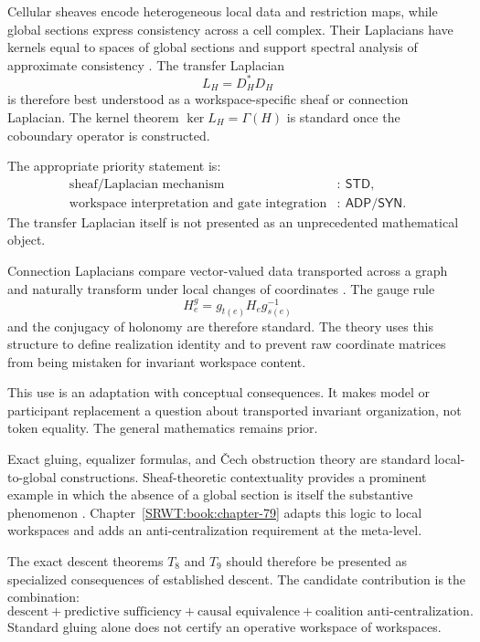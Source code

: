 
Cellular sheaves encode heterogeneous local data and restriction maps, while
global sections express consistency across a cell complex. Their Laplacians
have kernels equal to spaces of global sections and support spectral analysis
of approximate consistency \cite{SRWT:HansenGhrist2019,SRWT:Robinson2017}. The transfer
Laplacian
\[
L_H=D_H^*D_H
\]
is therefore best understood as a workspace-specific sheaf or connection
Laplacian. The kernel theorem \(\ker L_H=\Gamma(H)\) is standard once the
coboundary operator is constructed.

The appropriate priority statement is:
\[
\begin{aligned}
\text{sheaf/Laplacian mechanism} &:\ \mathsf{STD},\\
\text{workspace interpretation and gate integration} &:\ \mathsf{ADP}/\mathsf{SYN}.
\end{aligned}
\]
The transfer Laplacian itself is not presented as an
unprecedented mathematical object.


Connection Laplacians compare vector-valued data transported across a graph
and naturally transform under local changes of coordinates
\cite{SRWT:SingerWu2012}. The gauge rule
\[
H_e^g=g_{t(e)}H_eg_{s(e)}^{-1}
\]
and the conjugacy of holonomy are therefore standard. The theory uses
this structure to define realization identity and to prevent raw coordinate
matrices from being mistaken for invariant workspace content.

This use is an adaptation with conceptual consequences. It makes model or
participant replacement a question about transported invariant organization,
not token equality. The general mathematics remains prior.


Exact gluing, equalizer formulas, and \v{C}ech obstruction theory are standard
local-to-global constructions. Sheaf-theoretic contextuality provides a
prominent example in which the absence of a global section is itself the
substantive phenomenon \cite{SRWT:AbramskyBrandenburger2011}. Chapter~\ref{SRWT:book:chapter-79} adapts this
logic to local workspaces and adds an anti-centralization requirement at the
meta-level.

The exact descent theorems \(T_8\) and \(T_9\) should therefore be presented as
specialized consequences of established descent. The candidate contribution
is the combination:
\[
\text{descent}
+
\text{predictive sufficiency}
+
\text{causal equivalence}
+
\text{coalition anti-centralization}.
\]
Standard gluing alone does not certify an operative workspace of workspaces.

